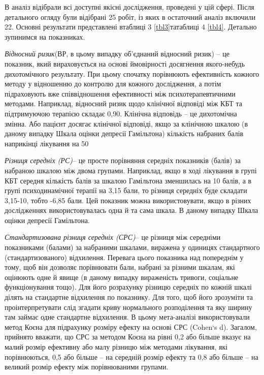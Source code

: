 \documentclass[twocolumn]{article}
\begin{document}
\par В аналіз відібрали всі доступні якісні дослідження, проведені у цій сфері. Після детального огляду були відібрані 25 робіт, із яких в остаточний аналіз включили 22. Основні результати представлені втаблиці 3 \ref{tbl3}татаблиці 4 \ref{tbl4}. Детально зупинимся на показниках.
\par \textit{Відносний ризик}(ВР, в цьому випадку об’єднаний відносний ризик) – це показник, який вираховується на основі ймовірності досягнення якого-небудь дихотомічного результату. При цьому спочатку порівнюють ефективність кожного методу у відношенню до контролю для кожного дослідження, а потім підраховують вже співвідношення ефективності між психотерапевтичними методами. Наприклад, відносний ризик щодо клінічної відповіді між КБТ та підтримуючою терапією складає 0,90. Клінічна відповідь – це дихотомічна змінна. Або пацієнт досягає клінічної відповіді, якщо за клінічною шкалою (в даному випадку Шкала оцінки депресії Гамільтона) кількість набраних балів наприкінці лікування на 50%
\par \textit{Різниця середніх (РС)}– це просте порівняння середніх показників (балів) за набраною шкалою між двома групами. Наприклад, якщо в ході лікування в групі КБТ середня кількість балів за шкалою Гамільтона зменшилась на 10 балів, а в групі психодинамічної терапії на 3,15 бали, то різниця середніх буде складати 3,15-10, тобто -6,85 бали. Цей показник можна використовувати, якщо в різних дослідженнях використовувалась одна й та сама шкала. В даному випадку Шкала оцінки депресії Гамільтона.
\par \textit{Стандартизована різниця середніх (СРС)}– це різниця між середніми показниками (балами) за набраними шкалами, виражена у одиницях стандартного (стандартизованого) відхилення. Перевага цього показника над попереднім у тому, щоб він дозволяє порівнювати бали, набрані за різними шкалам, які оцінюють одне й явище (в даному випадку вираженість тривоги, соціальне функціонування тощо). Для його розрахунку різницю середніх по кожній шкалі ділять на стандартне відхилення по показнику. Для того, щоб його зрозуміти та проінтерпретувати слід згадати криву нормального розподілення та яку ширину там займає одне стандартне відхилення. В цьому мета-аналізі використовували метод Коєна для підрахунку розміру ефекту на основі СРС (Cohen`s d). Загалом, прийнято вважати, що СРС за методом Коєна на рівні 0,2 або більше вказує на малий розмір ефективну або малу різницю між методами лікування, які порівнюються, 0,5 або більше – на середній розмір ефекту та 0,8 або більше – на великий розмір ефекту між порівнюваними групами.
\end{document}
